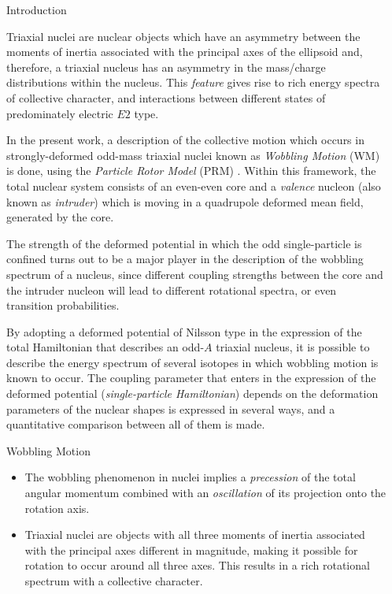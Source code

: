 \documentclass[final]{beamer}
\newlength{\sepwidth}
\newlength{\colwidth}
\newcommand{\separatorcolumn}{\begin{column}{\sepwidth}\end{column}}
\begin{document}
\begin{frame}[t]
\begin{columns}[t]
\separatorcolumn

\begin{column}{\colwidth}

  \begin{block}{Introduction}

Triaxial nuclei are nuclear objects which have an asymmetry between the moments of inertia associated with the principal axes of the ellipsoid and, therefore, a triaxial nucleus has an asymmetry in the mass/charge distributions within the nucleus. This \emph{feature} gives rise to rich energy spectra of collective character, and interactions between different states of predominately electric $E2$ type.

In the present work, a description of the collective motion which occurs in strongly-deformed odd-mass triaxial nuclei known as \emph{Wobbling Motion} (WM) is done, using the \emph{Particle Rotor Model} (PRM) \cite{bohr1998nuclear}. Within this framework, the total nuclear system consists of an even-even core and a \emph{valence} nucleon (also known as \emph{intruder}) which is moving in a quadrupole deformed mean field, generated by the core.

The strength of the deformed potential in which the odd single-particle is confined turns out to be a major player in the description of the wobbling spectrum of a nucleus, since different coupling strengths between the core and the intruder nucleon will lead to different rotational spectra, or even transition probabilities.

By adopting a deformed potential of Nilsson type \cite{nilsson1955mat} in the expression of the total Hamiltonian that describes an odd-$A$ triaxial nucleus, it is possible to describe the energy spectrum of several isotopes in which wobbling motion is known to occur. The coupling parameter that enters in the expression of the deformed potential (\emph{single-particle Hamiltonian}) depends on the deformation parameters of the nuclear shapes is expressed in several ways, and a quantitative comparison between all of them is made.

  \end{block}

  \begin{block}{Wobbling Motion}
  
\begin{itemize}
    \item The wobbling phenomenon in nuclei implies a \emph{precession} of the total angular momentum combined with an \emph{oscillation} of its projection onto the rotation axis.
    \item Triaxial nuclei are objects with all three moments of inertia associated with the principal axes different in magnitude, making it possible for rotation to occur around all three axes. This results in a rich rotational spectrum with a collective character.
\end{itemize}
  \end{block}
 


\end{column}
\end{columns}
\end{frame}
\end{document}
